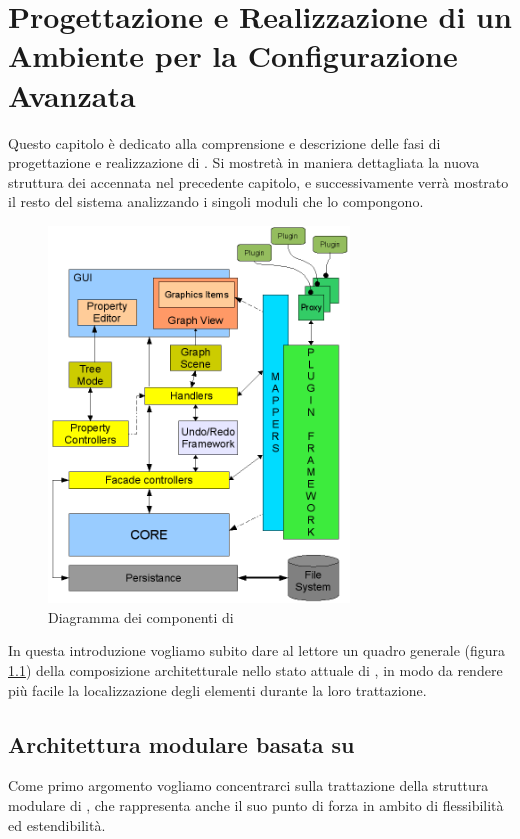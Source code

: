 \chapter{Progettazione e Realizzazione di un Ambiente per la Configurazione Avanzata}\label{capitolo:progettazione_realizzazione}
Questo capitolo è dedicato alla comprensione e descrizione delle fasi di progettazione e realizzazione di \visualnetkit{}. Si mostretà in maniera dettagliata la nuova struttura dei \plugin{} accennata nel precedente capitolo, e successivamente verrà mostrato il resto del sistema analizzando i singoli moduli che lo compongono.

\begin{figure}[!htb]
	\centering
	\includegraphics[width=8cm]{images/diagramma_componenti_vnetkit.png}
	\caption{Diagramma dei componenti di \visualnetkit{}}
	\label{figura:vn_componenti}
\end{figure}

In questa introduzione vogliamo subito dare al lettore un quadro generale (figura \ref{figura:vn_componenti}) della composizione architetturale nello stato attuale di \visualnetkit{}, in modo da rendere più facile la localizzazione degli elementi durante la loro trattazione.

\section{Architettura modulare basata su \plugin{}}
Come primo argomento vogliamo concentrarci sulla trattazione della struttura modulare di \visualnetkit{}, che rappresenta anche il suo punto di forza in ambito di flessibilità ed estendibilità. 

